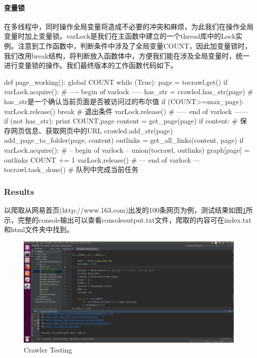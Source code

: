 \documentclass{article}
\begin{document}
\paragraph{变量锁}
在多线程中，同时操作全局变量将造成不必要的冲突和麻烦，为此我们在操作全局变量时加上变量锁。varLock是我们在主函数中建立的一个thread库中的Lock实例。注意到工作函数中，判断条件中涉及了全局变量COUNT，因此加变量锁时，我们改用break结构，将判断放入函数体中，方便我们能在涉及全局变量时，统一进行变量锁的操作。我们最终版本的工作函数代码如下。
\begin{python}
def page_working():
    global COUNT
    while (True):
        page = tocrawl.get()
        if varLock.acquire():   # ---- begin of varlock -----
            has_str = crawled.has_str(page)
                           # has_str是一个确认当前页面是否被访问过的布尔值
            if (COUNT>=max_page):
                varLock.release()
                break      # 退出条件
            varLock.release()   # ----- end of varlock ------
        if (not has_str):
            print COUNT,page
            content = get_page(page)
            if content:    # 保存网页信息、获取网页中的URL
                crawled.add_str(page)
                add_page_to_folder(page, content)
                outlinks = get_all_links(content, page)
                if varLock.acquire():  # -- begin of varlock --
                    union(tocrawl, outlinks)
                    graph[page] = outlinks
                    COUNT += 1
                    varLock.release()  # --- end of varlock ---
        tocrawl.task_done()    # 队列中完成当前任务
\end{python}



\subsubsection{Results}

以爬取从网易首页(http://www.163.com)出发的100条网页为例，测试结果如图\ref{img:2.1}所示，完整的console输出可以查看consoleoutput.txt文件，爬取的内容可在index.txt和html文件夹中找到。

\begin{figure}[htbp]
\centering
\includegraphics[width=13.5cm]{img/test2.png}
\caption{Crawler Testing}
\label{img:2.1}
\end{figure}
\end{document}
